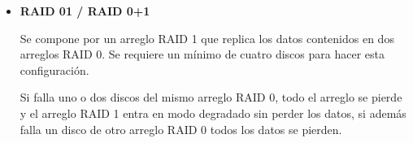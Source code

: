 \begin{itemize}

  \item \textbf{RAID 01 / RAID 0+1}

Se compone por un arreglo \textsc{RAID} 1 que replica los datos contenidos en dos arreglos \textsc{RAID} 0. Se requiere un m\'{i}nimo de cuatro discos para hacer esta configuraci\'{o}n.

Si falla uno o dos discos del mismo arreglo \textsc{RAID} 0, todo el arreglo se pierde y el arreglo \textsc{RAID} 1 entra en modo degradado sin perder los datos, si adem\'{a}s falla un disco de otro arreglo \textsc{RAID} 0 todos los datos se pierden.



\end{itemize}
